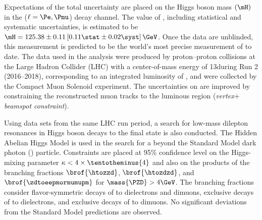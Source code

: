 % 
Expectations of the total uncertainty are placed on the Higgs boson mass $(\mH)$ in the \hzzfourl ($\ell = \Pe, \Pmu$) decay channel.
The value of \mH, including statistical and systematic uncertainties, is estimated to be $\mH = 125.38 \pm 0.11\left[0.11\stat \pm 0.02\syst \right]\GeV$.
Once the data are unblinded, this measurement is predicted to be the world's most precise measurement of \mH to date.
The data used in the analysis were produced by proton--proton collisions at the Large Hadron Collider (LHC) with a center-of-mass energy of 13\TeV during Run 2 (2016--2018), corresponding to an integrated luminosity of \lumiruntwo, and were collected by the Compact Muon Solenoid experiment.
The uncertainties on \mH are improved by constraining the reconstructed muon tracks to the luminous region (\emph{vertex$+$beamspot constraint}).


Using data sets from the same LHC run period, a search for low-mass dilepton resonances in Higgs boson decays to the \fourl final state is also conducted.
The Hidden Abelian Higgs Model is used in the search for a beyond the Standard Model dark photon (\PZD) particle.
Constraints are placed at 95\% confidence level on the Higgs-mixing parameter $\kappa < 4 \times \tentotheminus{4}$ and also on the products of the branching fractions $\brof{\htozzd}$, $\brof{\htozdzd}$, and $\brof{\zdtoeepmormumupm}$ for $\mass{\PZD} > 4\GeV$.
The branching fractions consider flavor-symmetric decays of \PZD to dielectrons and dimuons, exclusive decays of \PZD to dielectrons, and exclusive decays of \PZD to dimuons.
No significant deviations from the Standard Model predictions are observed.

